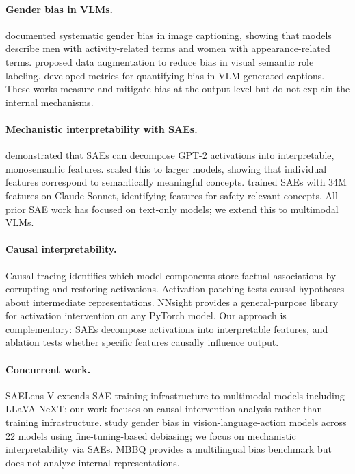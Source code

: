 \documentclass[11pt,a4paper]{article}
\newcommand{\sae}{SAE}
\newcommand{\saes}{SAEs}
\begin{document}
\paragraph{Gender bias in VLMs.}
\citet{hendricks2018women} documented systematic gender bias in image captioning, showing that models describe men with activity-related terms and women with appearance-related terms.
\citet{zhao2017men} proposed data augmentation to reduce bias in visual semantic role labeling.
\citet{hirota2022quantifying} developed metrics for quantifying bias in VLM-generated captions.
These works measure and mitigate bias at the output level but do not explain the internal mechanisms.

\paragraph{Mechanistic interpretability with SAEs.}
\citet{cunningham2023sparse} demonstrated that \saes{} can decompose GPT-2 activations into interpretable, monosemantic features.
\citet{bricken2023monosemanticity} scaled this to larger models, showing that individual features correspond to semantically meaningful concepts.
\citet{templeton2024scaling} trained \saes{} with 34M features on Claude Sonnet, identifying features for safety-relevant concepts.
All prior \sae{} work has focused on text-only models; we extend this to multimodal VLMs.

\paragraph{Causal interpretability.}
Causal tracing \citep{meng2022locating} identifies which model components store factual associations by corrupting and restoring activations.
Activation patching \citep{geiger2021causal} tests causal hypotheses about intermediate representations.
NNsight \citep{fiottokaufman2024nnsight} provides a general-purpose library for activation intervention on any PyTorch model.
Our approach is complementary: \saes{} decompose activations into interpretable features, and ablation tests whether specific features causally influence output.

\paragraph{Concurrent work.}
SAELens-V \citep{pku2025saelensv} extends \sae{} training infrastructure to multimodal models including LLaVA-NeXT; our work focuses on causal intervention analysis rather than training infrastructure.
\citet{girrbach2025revealing} study gender bias in vision-language-action models across 22 models using fine-tuning-based debiasing; we focus on mechanistic interpretability via \saes{}.
MBBQ \citep{wang2024mbbq} provides a multilingual bias benchmark but does not analyze internal representations.
\end{document}
